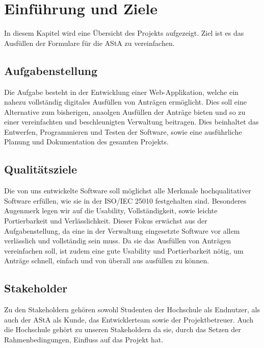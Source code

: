 \chapter{Einführung und Ziele}\label{ch:einfuhrung-und-ziele}

In diesem Kapitel wird eine Übersicht des Projekts aufgezeigt. Ziel ist es das Ausfüllen der Formulare für die AStA zu vereinfachen. 

\section{Aufgabenstellung}\label{sec:aufgabenstellung}
Die Aufgabe besteht in der Entwicklung einer Web-Applikation, welche ein nahezu vollständig digitales
Ausfüllen von Anträgen ermöglicht. Dies soll eine Alternative zum bisherigen, anaolgen Ausfüllen der Anträge bieten und so zu einer vereinfachten und beschleunigten Verwaltung beitragen.
Dies beinhaltet das Entwerfen, Programmieren und Testen der Software, sowie eine ausführliche Planung und Dokumentation des gesamten Projekts.

\section{Qualitätsziele}\label{sec:qualitatsziele}
Die von uns entwickelte Software soll möglichst alle Merkmale hochqualitativer Software erfüllen, wie 
sie in der ISO/IEC 25010 festgehalten sind. Besonderes Augenmerk legen wir auf die Usability, 
Vollständigkeit, sowie leichte Portierbarkeit und Verlässlichkeit. Dieser Fokus erwächst aus der
Aufgabenstellung, da eine in der Verwaltung eingesetzte Software vor allem verlässlich und vollständig
sein muss. Da sie das Ausfüllen von Anträgen vereinfachen soll, ist zudem eine gute Usability und
Portierbarkeit nötig, um Anträge schnell, einfach und von überall aus ausfüllen zu können.

\section{Stakeholder}\label{sec:stakeholder}
Zu den Stakeholdern gehören sowohl Studenten der Hochschule als Endnutzer, als auch
der \ac{AStA} als Kunde, das Entwicklerteam sowie der Projektbetreuer. Auch die Hochschule
gehört zu unseren Stakeholdern da sie, durch das Setzen der Rahmenbedingungen, Einfluss auf das 
Projekt hat.